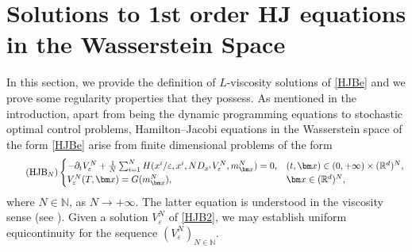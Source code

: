 \documentclass[reqno,11pt]{amsart}
\numberwithin{equation}{section}
\newcommand{\be}{\begin{equation}}
\newcommand{\ee}{\end{equation}}
\newcommand{\R}{\mathbb{R}} %
\newcommand{\e}{\varepsilon}
\newcommand{\ep}{\varepsilon}
\newcommand{\nd}{\noindent}
\begin{document}

\section{Solutions to 1st order HJ equations in the Wasserstein Space}\label{viscositysolutions}

\nd
In this section, we provide the definition of $L$-viscosity solutions of \eqref{HJBe} and we prove some regularity properties that they possess. As mentioned in the introduction, apart from being the dynamic programming equations to stochastic optimal control problems, Hamilton--Jacobi equations in the Wasserstein space of the form \eqref{HJBe} arise from finite dimensional problems of the form
\be\label{HJB2}\tag{$\mathrm{HJB}_N$}
    \begin{cases}
    -\partial_tV^N_\e+\frac{1}{N}\sum_{i=1}^NH(x^i/\e,x^i,ND_{x^i}V^N_\e,m^N_{\bm x})=0, &(t,\bm x)\in (0,+\infty)\times (\R^d)^N,\\
    V^N_\e(T,\bm x)= G(m_{\bm x}^N), & \bm x\in (\R^d)^N,
\end{cases}
\ee
where $N\in\mathbb{N}$, as $N\to +\infty$. The latter equation  is understood in the viscosity sense (see \cite{crandall1992user}). Given a solution $V^N_{\e}$ of \eqref{HJB2}, we may establish uniform equicontinuity for the sequence $(V^N_\e)_{N\in\mathbb{N}}$.
\vspace{1mm}
\end{document}
